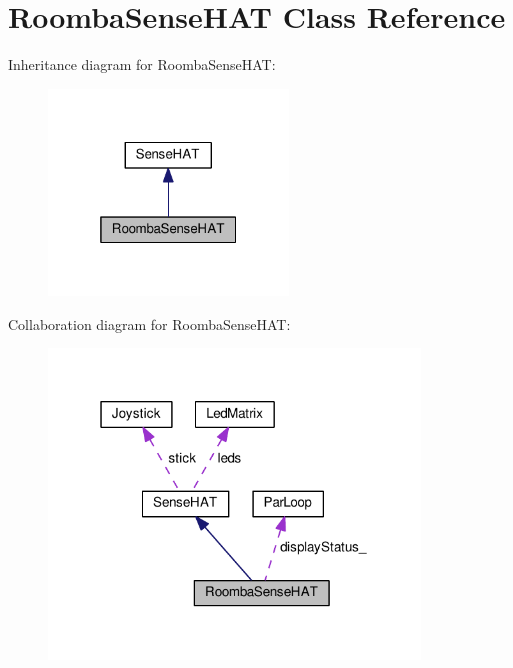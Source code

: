 \hypertarget{class_roomba_sense_h_a_t}{}\section{Roomba\+Sense\+H\+AT Class Reference}
\label{class_roomba_sense_h_a_t}


Inheritance diagram for Roomba\+Sense\+H\+AT\+:\nopagebreak
\begin{figure}[H]
\begin{center}
\leavevmode
\includegraphics[width=181pt]{class_roomba_sense_h_a_t__inherit__graph}
\end{center}
\end{figure}


Collaboration diagram for Roomba\+Sense\+H\+AT\+:\nopagebreak
\begin{figure}[H]
\begin{center}
\leavevmode
\includegraphics[width=280pt]{class_roomba_sense_h_a_t__coll__graph}
\end{center}
\end{figure}
